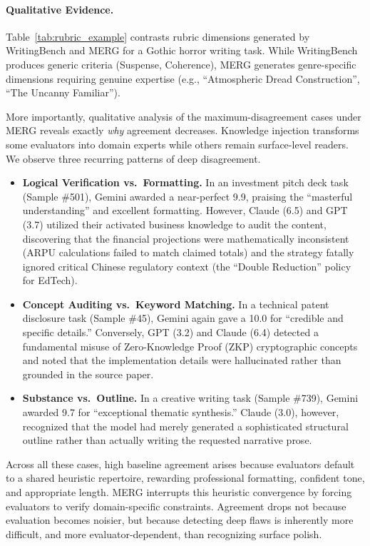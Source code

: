 \documentclass{article}
\begin{document}
\paragraph{Qualitative Evidence.} 
Table~\ref{tab:rubric_example} contrasts rubric dimensions generated by WritingBench and MERG for a Gothic horror writing task. While WritingBench produces generic criteria (Suspense, Coherence), MERG generates genre-specific dimensions requiring genuine expertise (e.g., ``Atmospheric Dread Construction'', ``The Uncanny Familiar'').

More importantly, qualitative analysis of the maximum-disagreement cases under MERG reveals exactly \textit{why} agreement decreases. Knowledge injection transforms some evaluators into domain experts while others remain surface-level readers. We observe three recurring patterns of deep disagreement.
\begin{itemize}
    \item \textbf{Logical Verification vs.\ Formatting.} In an investment pitch deck task (Sample \#501), Gemini awarded a near-perfect 9.9, praising the ``masterful understanding'' and excellent formatting. However, Claude (6.5) and GPT (3.7) utilized their activated business knowledge to audit the content, discovering that the financial projections were mathematically inconsistent (ARPU calculations failed to match claimed totals) and the strategy fatally ignored critical Chinese regulatory context (the ``Double Reduction'' policy for EdTech). 
    \item \textbf{Concept Auditing vs.\ Keyword Matching.} In a technical patent disclosure task (Sample \#45), Gemini again gave a 10.0 for ``credible and specific details.'' Conversely, GPT (3.2) and Claude (6.4) detected a fundamental misuse of Zero-Knowledge Proof (ZKP) cryptographic concepts and noted that the implementation details were hallucinated rather than grounded in the source paper.
    \item \textbf{Substance vs.\ Outline.} In a creative writing task (Sample \#739), Gemini awarded 9.7 for ``exceptional thematic synthesis.'' Claude (3.0), however, recognized that the model had merely generated a sophisticated structural outline rather than actually writing the requested narrative prose.
\end{itemize}
Across all these cases, high baseline agreement arises because evaluators default to a shared heuristic repertoire, rewarding professional formatting, confident tone, and appropriate length. MERG interrupts this heuristic convergence by forcing evaluators to verify domain-specific constraints. Agreement drops not because evaluation becomes noisier, but because detecting deep flaws is inherently more difficult, and more evaluator-dependent, than recognizing surface polish.
\end{document}
